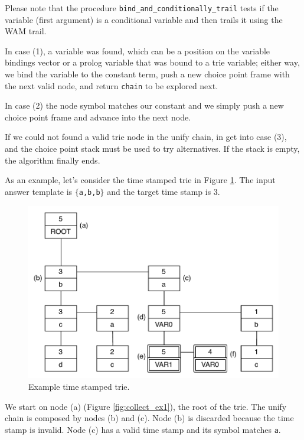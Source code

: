 Please note that the procedure \texttt{bind\_and\_conditionally\_trail} tests if the variable (first argument)
is a conditional variable and then trails it using the WAM trail.

In case (1), a variable was found, which can be a position on the variable bindings vector or a prolog
variable that was bound to a trie variable; either way, we bind the variable to the constant term,
push a new choice point frame with the next valid node, and return \texttt{chain} to be explored next.

In case (2) the node symbol matches our constant and we simply push a new choice point frame and advance into the next node.

If we could not found a valid trie node in the unify chain, in get into case (3), and the choice point
stack must be used to try alternatives. If the stack is empty, the algorithm finally ends.

As an example, let's consider the time stamped trie in
Figure \ref{fig:collect_example_1}. The input answer template is $\{$\texttt{a,b,b}$\}$ and the target time stamp is 3.

\begin{figure}[H]
  \centering
    \includegraphics[scale=0.6]{collect_example_1.pdf}
  \caption{Example time stamped trie.}
  \label{fig:collect_example_1}
\end{figure}

We start on node (a) (Figure \ref{fig:collect_ex1}), the root of the trie. The unify chain
is composed by nodes (b) and (c). Node (b) is discarded because the time stamp is invalid.
Node (c) has a valid time stamp and its symbol matches \texttt{a}.

